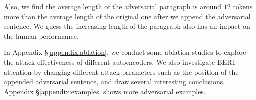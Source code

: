 Also, we find the average length of the adversarial paragraph is around $12$ tokens more than the average length of the original one after we append the adversarial sentence. We guess the increasing length of the paragraph also has an impact on the human performance.


In Appendix \S\ref{appendix:ablation}, we conduct some ablation studies to explore the attack effectiveness of different autoencoders. We also investigate BERT attention by changing different attack parameters such as the position of the appended adversarial sentence, and draw several interesting conclusions. Appendix \S\ref{appendix:examples} shows more adversarial examples.


% 


